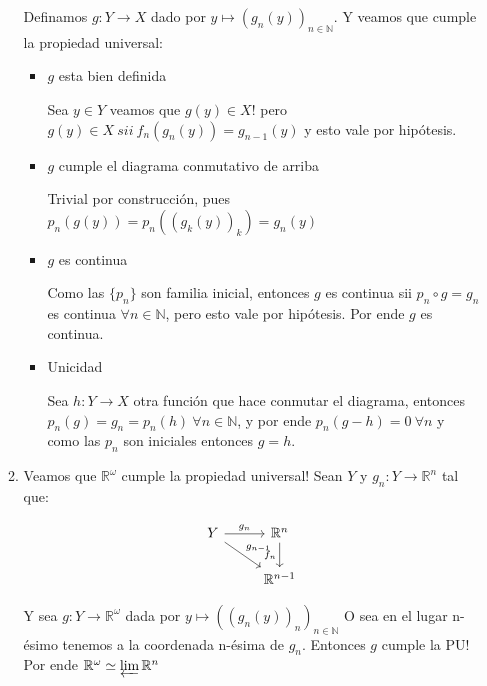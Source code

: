 \documentclass[11pt]{article}
\newcommand{\R}{{\mathbb{R}}}
\newcommand{\N}{{\mathbb{N}}}
\newcommand{\sett}[1]{\{#1\}}
\newenvironment{proof}[1][Demostraci\'on]{\begin{trivlist}
\item[\hskip \labelsep {\bfseries #1}]}{\end{trivlist}}
\newcommand{\qed}{\nobreak \ifvmode \relax \else
      \ifdim\lastskip<1.5em \hskip-\lastskip
      \hskip1.5em plus0em minus0.5em \fi \nobreak
      \vrule height0.75em width0.5em depth0.25em\fi}
\begin{document}
\begin{proof}
\begin{enumerate}
\begin{enumerate}
Definamos $g : Y \rightarrow X$ dado por $y \mapsto (g_n(y))_{n \in \N}$. Y veamos que cumple la propiedad universal:

\begin{itemize}
\item {$g$ esta bien definida}

Sea $y \in Y$ veamos que $g(y) \in X$! pero $g(y) \in X \ sii \ f_n(g_n(y)) = g_{n-1}(y)$ y esto vale por hip\'otesis.

\item {$g$ cumple el diagrama conmutativo de arriba}

Trivial por construcci\'on, pues $p_n(g(y)) = p_n( (g_k(y))_k )=g_n(y)$

\item {$g$ es continua}

Como las $\sett{p_n}$ son familia inicial, entonces $g$ es continua sii $p_n \circ g = g_n$ es continua $\forall n \in \N$, pero esto vale por hip\'otesis. Por ende $g$ es continua.

\item {Unicidad}

Sea $h : Y \rightarrow X$ otra funci\'on que hace conmutar el diagrama, entonces $p_n(g) = g_n = p_n(h) \ \forall n \in \N$, y por ende $p_n(g-h) = 0 \ \forall n$ y como las $p_n$ son iniciales entonces $g = h$.

\end{itemize}

\item Veamos que $\R^{\omega}$ cumple la propiedad universal! Sean $Y$ y $g_n : Y \rightarrow \R^n$ tal que:

\[
\begin{tikzcd}
Y \arrow{r}{g_n} \arrow{dr}{g_{n-1}} & \R^n \arrow[swap]{d}{f_n} \\
& \R^{n-1}
\end{tikzcd}
\]

Y sea $g : Y \rightarrow \R^{\omega}$ dada por $y \mapsto ((g_n(y))_n)_{n \in \N}$ O sea en el lugar n-\'esimo tenemos a la coordenada n-\'esima de $g_n$. Entonces $g$ cumple la PU! Por ende $\R^{\omega} \simeq \varprojlim \R^n$ \qed

\end{enumerate}

\end{enumerate}

\end{proof}

\bigskip
\end{document}
